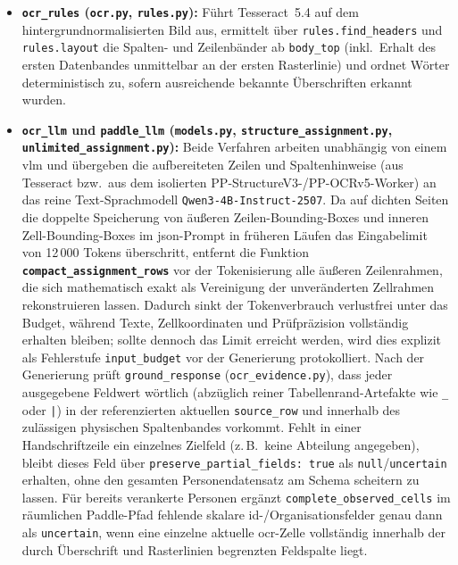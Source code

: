 \begin{itemize}
  \item \textbf{\texttt{ocr\_rules} (\texttt{ocr.py}, \texttt{rules.py}):} Führt Tesseract~5.4 auf dem hintergrundnormalisierten Bild aus, ermittelt über \texttt{rules.find\_headers} und \texttt{rules.layout} die Spalten- und Zeilenbänder ab \texttt{body\_top} (inkl.\ Erhalt des ersten Datenbandes unmittelbar an der ersten Rasterlinie) und ordnet Wörter deterministisch zu, sofern ausreichende bekannte Überschriften erkannt wurden.
  \item \textbf{\texttt{ocr\_llm} und \texttt{paddle\_llm} (\texttt{models.py}, \texttt{structure\_assignment.py}, \texttt{unlimited\_assignment.py}):} Beide Verfahren arbeiten unabhängig von einem \ac{vlm} und übergeben die aufbereiteten Zeilen und Spaltenhinweise (aus Tesseract bzw.\ aus dem isolierten PP-StructureV3-/PP-OCRv5-Worker) an das reine Text-Sprachmodell \texttt{Qwen3-4B-Instruct-2507}. Da auf dichten Seiten die doppelte Speicherung von äußeren Zeilen-Bounding-Boxes und inneren Zell-Bounding-Boxes im \ac{json}-Prompt in früheren Läufen das Eingabelimit von \mbox{12\,000} Tokens überschritt, entfernt die Funktion \textbf{\texttt{compact\_assignment\_rows}} vor der Tokenisierung alle äußeren Zeilenrahmen, die sich mathematisch exakt als Vereinigung der unveränderten Zellrahmen rekonstruieren lassen. Dadurch sinkt der Tokenverbrauch verlustfrei unter das Budget, während Texte, Zellkoordinaten und Prüfpräzision vollständig erhalten bleiben; sollte dennoch das Limit erreicht werden, wird dies explizit als Fehlerstufe \texttt{input\_budget} vor der Generierung protokolliert. Nach der Generierung prüft \texttt{ground\_response} (\texttt{ocr\_evidence.py}), dass jeder ausgegebene Feldwert wörtlich (abzüglich reiner Tabellenrand-Artefakte wie \texttt{\_} oder \texttt{|}) in der referenzierten aktuellen \texttt{source\_row} und innerhalb des zulässigen physischen Spaltenbandes vorkommt. Fehlt in einer Handschriftzeile ein einzelnes Zielfeld (z.\,B.\ keine Abteilung angegeben), bleibt dieses Feld über \texttt{preserve\_partial\_fields: true} als \texttt{null}/\texttt{uncertain} erhalten, ohne den gesamten Personendatensatz am Schema scheitern zu lassen. Für bereits verankerte Personen ergänzt \texttt{complete\_observed\_cells} im räumlichen Paddle-Pfad fehlende skalare \ac{id}-/Organisationsfelder genau dann als \texttt{uncertain}, wenn eine einzelne aktuelle \ac{ocr}-Zelle vollständig innerhalb der durch Überschrift und Rasterlinien begrenzten Feldspalte liegt.

\end{itemize}
